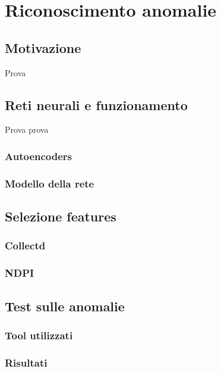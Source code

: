 \chapter{Riconoscimento anomalie}


\section{Motivazione}
Prova 


\section{Reti neurali e funzionamento}
Prova prova
\subsection{Autoencoders}
\subsection{Modello della rete}


\section{Selezione features}
\subsection{Collectd}
\subsection{NDPI}

\section{Test sulle anomalie}
\subsection{Tool utilizzati}
\subsection{Risultati}
